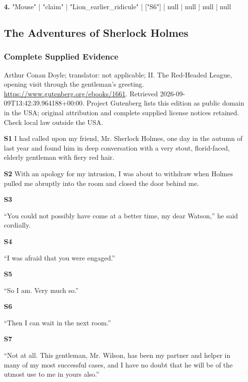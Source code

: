 \noindent\textbf{4.} "Mouse" | "claim" | "Lion\_earlier\_ridicule" | ["S6"] | null | null | null | null\par\smallskip

\clearpage\subsection*{The Adventures of Sherlock Holmes}

\subsubsection*{Complete Supplied Evidence}

Arthur Conan Doyle; translator: not applicable; II. The Red-Headed League, opening visit through the gentleman's greeting. \url{https://www.gutenberg.org/ebooks/1661}. Retrieved 2026-09-09T13:42:39.964188+00:00. Project Gutenberg lists this edition as public domain in the USA; original attribution and complete supplied license notices retained. Check local law outside the USA.

\noindent\textbf{S1}  I had called upon my friend, Mr. Sherlock Holmes, one day in the
 autumn of last year and found him in deep conversation with a very
 stout, florid-faced, elderly gentleman with fiery red hair.\par\smallskip

\noindent\textbf{S2}  With an
 apology for my intrusion, I was about to withdraw when Holmes pulled
 me abruptly into the room and closed the door behind me.\par\smallskip

\noindent\textbf{S3} 

``You could not possibly have come at a better time, my dear Watson,'' he
said cordially.\par\smallskip

\noindent\textbf{S4} 

``I was afraid that you were engaged.''\par\smallskip

\noindent\textbf{S5} 

``So I am. Very much so.''\par\smallskip

\noindent\textbf{S6} 

``Then I can wait in the next room.''\par\smallskip

\noindent\textbf{S7} 

``Not at all. This gentleman, Mr. Wilson, has been my partner and helper
in many of my most successful cases, and I have no doubt that he will
be of the utmost use to me in yours also.''\par\smallskip


